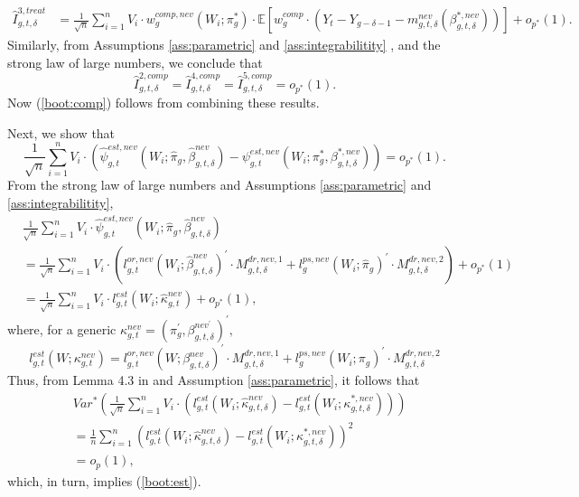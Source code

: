 \documentclass[11pt]{article}%
\theoremstyle{plain}
\numberwithin{sassumption}{section}
\numberwithin{equation}{section}
\begin{document}
{\begin{align*}
\widehat{I}_{g,t,\delta}^{3,treat}  &  =\frac{1}{\sqrt{n}}\sum_{i=1}^{n}%
V_{i}\cdot w_{g}^{comp,nev}\left(  W_{i};\pi_{g}^{\ast}\right)  \cdot
\mathbb{E}\left[  w_{g}^{comp}\cdot\left(  Y_{t}-Y_{g-\delta-1}-m_{g,t,\delta
}^{nev}\left(  \beta_{g,t,\delta}^{\ast,nev}\right)  \right)  \right]
+o_{p^{\ast}}\left(  1\right)  .
\end{align*}
Similarly, from Assumptions \ref{ass:parametric} and \ref{ass:integrabilitity}%
, and the strong law of large numbers, we conclude that%
\[
\widehat{I}_{g,t,\delta}^{2,comp}=\widehat{I}_{g,t,\delta}^{4,comp}%
=\widehat{I}_{g,t,\delta}^{5,comp}=o_{p^{\ast}}\left(  1\right)  .
\]
Now (\ref{boot:comp}) follows from combining these results. }

{\small Next, we show that%
\begin{equation}
\frac{1}{\sqrt{n}}\sum_{i=1}^{n}V_{i}\cdot\left(  \widehat{\psi}%
_{g,t}^{est,nev}(W_{i};\widehat{\pi}_{g},\widehat{\beta}_{g,t,\delta}%
^{nev})-\psi_{g,t}^{est,nev}(W_{i};\pi_{g}^{\ast},\beta_{g,t,\delta}%
^{\ast,nev})\right)  =o_{p^{\ast}}\left(  1\right)  . \label{boot:est}%
\end{equation}
From the strong law of large numbers and Assumptions \ref{ass:parametric} and
\ref{ass:integrabilitity},%
\begin{align*}
&  \frac{1}{\sqrt{n}}\sum_{i=1}^{n}V_{i}\cdot\widehat{\psi}_{g,t}%
^{est,nev}(W_{i};\widehat{\pi}_{g},\widehat{\beta}_{g,t,\delta}^{nev})\\
&  =\frac{1}{\sqrt{n}}\sum_{i=1}^{n}V_{i}\cdot\left(  l_{g,t}^{or,nev}\left(
W_{i};\widehat{\beta}_{g,t,\delta}^{nev}\right)  ^{\prime}\cdot M_{g,t,\delta
}^{dr,nev,1}+l_{g}^{ps,nev}\left(  W_{i};\widehat{\pi}_{g}\right)  ^{\prime
}\cdot M_{g,t,\delta}^{dr,nev,2}\right)  +o_{p^{\ast}}\left(  1\right) \\
&  =\frac{1}{\sqrt{n}}\sum_{i=1}^{n}V_{i}\cdot l_{g,t}^{est}\left(
W_{i};\widehat{\kappa}_{g,t}^{nev}\right)  +o_{p^{\ast}}\left(  1\right)  ,
\end{align*}
where, for a generic $\kappa_{g,t}^{nev}=\left(  \pi_{g}^{\prime}%
,\beta_{g,t,\delta}^{nev^{\prime}}\right)  ^{\prime},$
\[
l_{g,t}^{est}\left(  W;\kappa_{g,t}^{nev}\right)  =l_{g,t}^{or,nev}\left(
W;\beta_{g,t,\delta}^{nev}\right)  ^{\prime}\cdot M_{g,t,\delta}%
^{dr,nev,1}+l_{g}^{ps,nev}\left(  W_{i};\pi_{g}\right)  ^{\prime}\cdot
M_{g,t,\delta}^{dr,nev,2}%
\]
Thus, from Lemma 4.3 in \cite{Newey1994c} and Assumption \ref{ass:parametric},
it follows that
\begin{align*}
&  Var^{\ast}\left(  \frac{1}{\sqrt{n}}\sum_{i=1}^{n}V_{i}\cdot\left(
l_{g,t}^{est}\left(  W_{i};\widehat{\kappa}_{g,t,\delta}^{nev}\right)
-l_{g,t}^{est}\left(  W_{i};\kappa_{g,t,\delta}^{\ast,nev}\right)  \right)
\right) \\
&  =\frac{1}{n}\sum_{i=1}^{n}\left(  l_{g,t}^{est}\left(  W_{i}%
;\widehat{\kappa}_{g,t,\delta}^{nev}\right)  -l_{g,t}^{est}\left(
W_{i};\kappa_{g,t,\delta}^{\ast,nev}\right)  \right)  ^{2}\\
&  =o_{p}\left(  1\right)  ,
\end{align*}
which, in turn, implies (\ref{boot:est}). }
\end{document}

